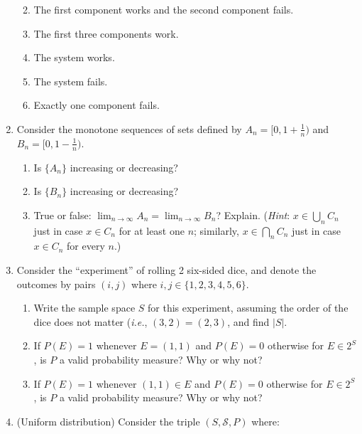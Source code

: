 \documentclass[
  letterpaper,
  DIV=11,
  numbers=noendperiod]{scrartcl}
\providecommand{\tightlist}{%
  \setlength{\itemsep}{0pt}\setlength{\parskip}{0pt}}\usepackage{longtable,booktabs,array}
\begin{document}
\begin{enumerate}
  \begin{enumerate}
  \def\labelenumii{\roman{enumii}.}
  \tightlist
  \item
    The first component works and the second component fails.
  \item
    The first three components work.
  \item
    The system works.
  \item
    The system fails.
  \item
    Exactly one component fails.
  \end{enumerate}
\newpage
\item
  Consider the monotone sequences of sets defined by
  \(A_n = [0, 1 + \frac{1}{n})\) and \(B_n = [0, 1 - \frac{1}{n})\).

  \begin{enumerate}
  \def\labelenumii{\roman{enumii}.}
  \tightlist
  \item
    Is \(\{A_n\}\) increasing or decreasing?
  \item
    Is \(\{B_n\}\) increasing or decreasing?
  \item
    True or false:
    \(\lim_{n \rightarrow\infty} A_n = \lim_{n\rightarrow\infty} B_n\)?
    Explain. (\emph{Hint}: \(x \in \bigcup_n C_n\) just in case
    \(x \in C_n\) for at least one \(n\); similarly,
    \(x \in \bigcap_n C_n\) just in case \(x \in C_n\) for every \(n\).)
  \end{enumerate}
\newpage
\item
  Consider the ``experiment'' of rolling 2 six-sided dice, and denote
  the outcomes by pairs \((i, j)\) where
  \(i, j \in \{1, 2, 3, 4, 5, 6\}\).

  \begin{enumerate}
  \def\labelenumii{\roman{enumii}.}
  \tightlist
  \item
    Write the sample space \(S\) for this experiment, assuming the order
    of the dice does not matter (\emph{i.e.}, \((3, 2) = (2, 3)\), and
    find \(|S|\).
  \item
    If \(P(E) = 1\) whenever \(E = (1, 1)\) and \(P(E) = 0\) otherwise
    for \(E \in 2^S\), is \(P\) a valid probability measure? Why or why
    not?
  \item
    If \(P(E) = 1\) whenever \((1, 1) \in E\) and \(P(E) = 0\) otherwise
    for \(E \in 2^S\), is \(P\) a valid probability measure? Why or why
    not?
  \end{enumerate}
\newpage
\item
  (Uniform distribution) Consider the triple \((S, \mathcal{S}, P)\)
  where:


\end{enumerate}
\end{document}

